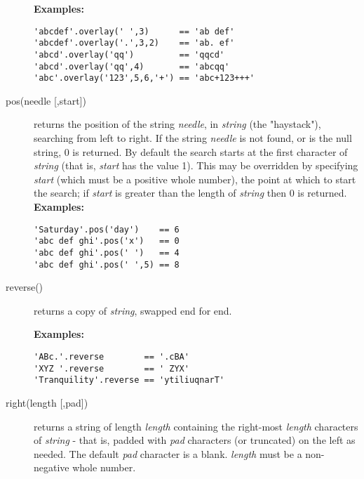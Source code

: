 \begin{description}
\textbf{Examples:}
\begin{lstlisting}
'abcdef'.overlay(' ',3)      == 'ab def'
'abcdef'.overlay('.',3,2)    == 'ab. ef'
'abcd'.overlay('qq')         == 'qqcd'
'abcd'.overlay('qq',4)       == 'abcqq'
'abc'.overlay('123',5,6,'+') == 'abc+123+++'
\end{lstlisting}

\item[pos(needle [,start{]})]\label{refpos}
returns the position of the string \emph{needle}, in
\emph{string} (the "haystack"), searching from left to right.
If the string \emph{needle} is not found, or is the null string,
0 is returned.
By default the search starts at the first character of
\emph{string} (that is, \emph{start} has the value 1).
This may be overridden by specifying \emph{start} (which must be a
positive whole number), the point at which to start the search; if
\emph{start} is greater than the length of \emph{string} then 0
is returned.
 \textbf{Examples:}
\begin{lstlisting}
'Saturday'.pos('day')    == 6
'abc def ghi'.pos('x')   == 0
'abc def ghi'.pos(' ')   == 4
'abc def ghi'.pos(' ',5) == 8
\end{lstlisting}

\item[reverse()]\label{refreverse}
returns a copy of \emph{string}, swapped end for end.
 
\textbf{Examples:}
\begin{lstlisting}
'ABc.'.reverse        == '.cBA'
'XYZ '.reverse        == ' ZYX'
'Tranquility'.reverse == 'ytiliuqnarT'
\end{lstlisting}

\item[right(length [,pad{]})]\label{refright}

returns a string of length \emph{length} containing the
right-most \emph{length} characters of \emph{string} -
that is, padded with \emph{pad} characters (or truncated) on the
left as needed.  The default \emph{pad} character is a blank.
\emph{length} must be a non-negative whole number.
 

\end{description}
